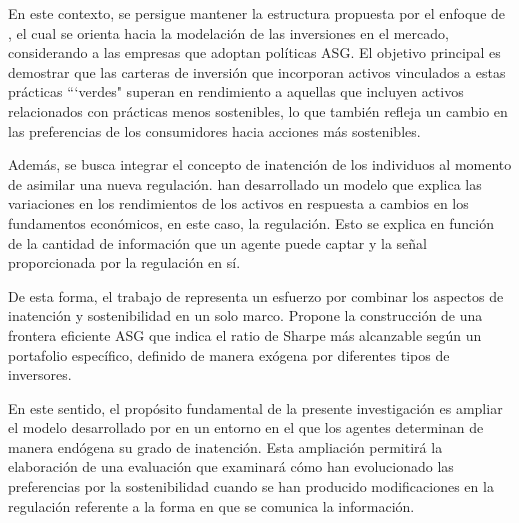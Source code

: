 \vspace{0.5cm}


En este contexto, se persigue mantener la estructura propuesta por el enfoque de \cite{pastor_sustainable_2021}, el cual se orienta hacia la modelación de las inversiones en el mercado, considerando a las empresas que adoptan políticas ASG. El objetivo principal es demostrar que las carteras de inversión que incorporan activos vinculados a estas prácticas ```verdes" superan en rendimiento a aquellas que incluyen activos relacionados con prácticas menos sostenibles, lo que también refleja un cambio en las preferencias de los consumidores hacia acciones más sostenibles.

Además, se busca integrar el concepto de inatención de los individuos al momento de asimilar una nueva regulación. \cite{heinke_rational_2016} han desarrollado un modelo que explica las variaciones en los rendimientos de los activos en respuesta a cambios en los fundamentos económicos, en este caso, la regulación. Esto se explica en función de la cantidad de información que un agente puede captar y la señal proporcionada por la regulación en sí.

De esta forma, el trabajo de \cite{pedersen_responsible_2021} representa un esfuerzo por combinar los aspectos de inatención y sostenibilidad en un solo marco. Propone la construcción de una frontera eficiente ASG que indica el ratio de Sharpe más alcanzable según un portafolio específico, definido de manera exógena por diferentes tipos de inversores.

En este sentido, el propósito fundamental de la presente investigación es ampliar el modelo desarrollado por \cite{pedersen_responsible_2021} en un entorno en el que los agentes determinan de manera endógena su grado de inatención. Esta ampliación permitirá la elaboración de una evaluación que examinará cómo han evolucionado las preferencias por la sostenibilidad cuando se han producido modificaciones en la regulación referente a la forma en que se comunica la información.
